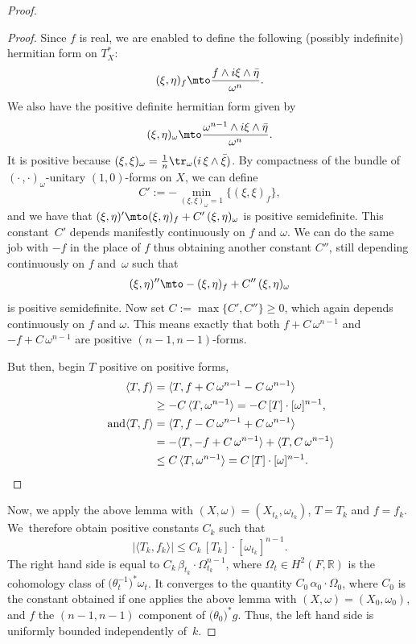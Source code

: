 \begin{appendix}
\begin{proof}
\begin{proof}
Since $f$ is real, we are enabled to define the following (possibly indefinite) hermitian form on $T_X^*$:
\[
(\xi,\eta)_f\mto \frac{f\wedge i\xi\wedge\bar\eta}{\omega^n}.
\]
We also have the positive definite hermitian form given by
\[
(\xi,\eta)_\omega\mto \frac{\omega^{n-1}\wedge i\xi\wedge\bar\eta}{\omega^n}.
\]
It is positive because $(\xi,\xi)_\omega=\frac 1n\tr_\omega(i\,\xi\wedge\bar\xi)$.
By compactness of the bundle of $(\cdot\,,\cdot)_\omega$-unitary $(1,0)$-forms on $X$, we can define
\[
C':=-\min_{(\xi,\xi)_\omega=1}\{(\xi,\xi)_f\},
\]
and we have that $(\xi,\eta)'\mto (\xi,\eta)_f+C'\,(\xi,\eta)_\omega$ is positive semidefinite. This constant~$C'$ depends manifestly continuously on $f$ and $\omega$. We can do the same job with $-f$ in the place of $f$ thus obtaining another constant $C''$, still depending continuously on $f$ and~$\omega$ such that
\[
(\xi,\eta)''\mto -(\xi,\eta)_f+C''\,(\xi,\eta)_\omega
\]
is positive semidefinite. Now set $C:=\max\{C',C''\}\ge 0$, which again depends continuously on $f$ and $\omega$. This means exactly that both $f+C\,\omega^{n-1}$ and $-f+C\,\omega^{n-1}$ are positive $(n-1,n-1)$-forms.

But then, begin $T$ positive on positive forms,
\begin{align*}
\langle T, f\rangle &= \langle T, f+C\,\omega^{n-1}-C\,\omega^{n-1}\rangle \\
&\ge -C\,\langle T, \omega^{n-1}\rangle=-C\, [T]\cdot[\omega]^{n-1},
\\
\tag*{and}
\langle T, f\rangle &= \langle T, f-C\,\omega^{n-1}+C\,\omega^{n-1}\rangle \\
&= -\langle T,-f+C\,\omega^{n-1}\rangle+\langle T, C\,\omega^{n-1}\rangle\\
& \le C\,\langle T, \omega^{n-1}\rangle=C\, [T]\cdot[\omega]^{n-1}.\qedhere
\end{align*}
\end{proof}

Now, we apply the above lemma with $(X,\omega)=(X_{t_k},\omega_{t_k})$, $T=T_k$ and $f=f_k$. We~therefore obtain positive constants $C_k$ such that
\[
|\langle T_k,f_k\rangle|\le C_k\,[T_k]\cdot[\omega_{t_k}]^{n-1}.
\]
The right hand side is equal to $C_k\,\beta_{t_k}\cdot\Omega_{t_k}^{n-1}$, where $\Omega_t\in H^2(F,\mathbb R)$ is the cohomology class of $\bigl(\theta_t^{-1}\bigr)^*\omega_t$. It converges to the quantity $C_0\,\alpha_0\cdot\Omega_0$, where $C_0$ is the constant obtained if one applies the above lemma with $(X,\omega)=(X_{0},\omega_{0})$, and $f$ the $(n-1,n-1)$ component of $\bigl(\theta_{0}\bigr)^*g$. Thus, the left hand side is uniformly bounded independently of~$k$.


\end{proof}
\end{appendix}
